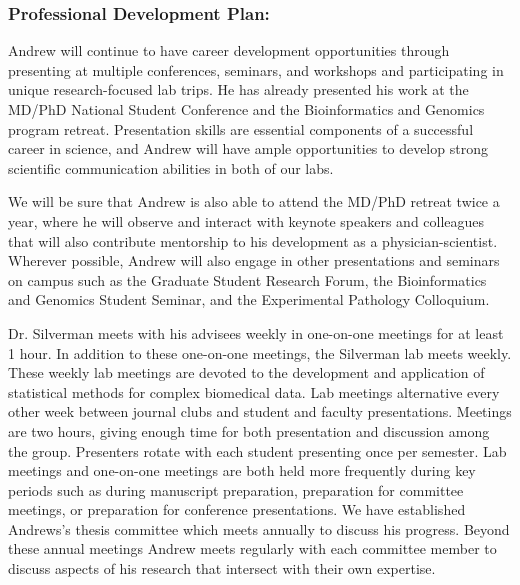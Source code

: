 \documentclass{NIHGrant}
\begin{document}
\subsubsection*{Professional Development Plan: }
Andrew will continue to have career development opportunities through presenting at multiple conferences, seminars, and workshops and participating in unique research-focused lab trips. He has already presented his work at the MD/PhD National Student Conference and the Bioinformatics and Genomics program retreat. Presentation skills are essential components of a successful career in science, and Andrew will have ample opportunities to develop strong scientific communication abilities in both of our labs.

We will be sure that Andrew is also able to attend the MD/PhD retreat twice a year, where he will observe and interact with keynote speakers and colleagues that will also contribute mentorship to his development as a physician-scientist. Wherever possible, Andrew will also engage in other presentations and seminars on campus such as the Graduate Student Research Forum, the Bioinformatics and Genomics Student Seminar, and the Experimental Pathology Colloquium.

Dr. Silverman meets with his advisees weekly in one-on-one meetings for at least
1 hour. In addition to these one-on-one meetings, the Silverman lab meets
weekly. These weekly lab meetings are devoted to the development and application
of statistical methods for complex biomedical data. Lab meetings alternative
every other week between journal clubs and student and faculty presentations.
Meetings are two hours, giving enough time for both presentation and discussion
among the group. Presenters rotate with each student presenting once per
semester. Lab meetings and one-on-one meetings are both held more frequently
during key periods such as during manuscript preparation, preparation for
committee meetings, or preparation for conference presentations. We have
established Andrews's thesis committee which meets annually to discuss his
progress. Beyond these annual meetings Andrew meets regularly with each
committee member to discuss aspects of his research that intersect with their
own expertise.
\end{document}
